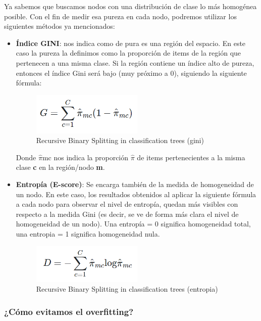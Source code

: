 Ya sabemos que buscamos nodos con una distribución de clase lo más homogénea posible. Con el fin de medir esa pureza en cada nodo, podremos utilizar los siguientes métodos ya mencionados:
\begin{itemize}
	\item \textbf{Índice GINI}: nos indica como de pura es una región del espacio. En este caso la pureza la definimos como la proporción de items de la región que pertenecen a una misma clase. Si la región contiene un índice
	alto de pureza, entonces el índice Gini será bajo (muy próximo a 0), siguiendo la siguiente fórmula:
	\begin{figure}[H]
		\centering
		\includegraphics[width=0.5\textwidth]{imagenes/gini} 
		\caption{Recursive Binary Splitting in classification trees (gini) \cite{ref8}}
	\end{figure}
	Donde $\widehat{\pi}$mc nos indica la proporción \textbf{$\widehat{\pi}$} de items pertenecientes a la misma clase \textbf{c} en la región/nodo \textbf{m}.
	\item \textbf{Entropía (E-score)}: Se encarga también de la medida de homogeneidad de un nodo. En este caso, los resultados obtenidos al aplicar la siguiente fórmula a cada nodo para observar el nivel de entropía, quedan más visibles con respecto a la medida Gini (es decir, se ve de forma más clara el nivel de homogeneidad de un nodo). Una entropía = 0 significa homogeneidad total, una entropia = 1 significa homogeneidad nula.
	\begin{figure}[H]
		\centering
		\includegraphics[width=0.5\textwidth]{imagenes/entropia} 
		\caption{Recursive Binary Splitting in classification trees (entropia) \cite{ref8}}
	\end{figure}
\end{itemize}

\subsubsection{¿Cómo evitamos el overfitting?}

